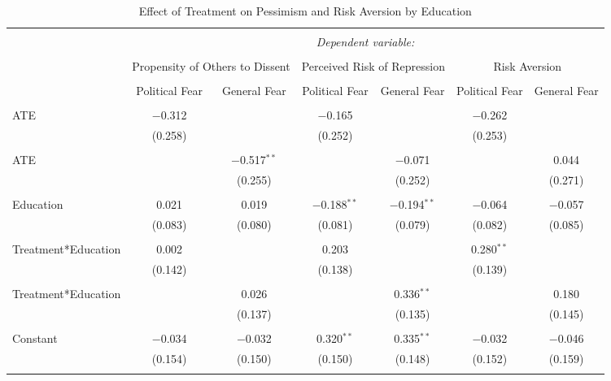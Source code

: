 \documentclass{article}
\begin{document}
\begin{landscape}
\setlength{\tabcolsep}{0.3pt}
\begin{table}[!htbp] \centering 
  \caption{Effect of Treatment on Pessimism and Risk Aversion by Education} 
  \label{} 
\begin{tabular}{@{\extracolsep{5pt}}lcccccc} 
\\[-1.8ex]\hline 
\hline \\[-1.8ex] 
 & \multicolumn{6}{c}{\textit{Dependent variable:}} \\ 
\cline{2-7} 
\\[-1.8ex] & \multicolumn{2}{c}{Propensity of Others to Dissent} & \multicolumn{2}{c}{Perceived Risk of Repression} & \multicolumn{2}{c}{Risk Aversion} \\ 
\\[-1.8ex] & Political Fear & General Fear & Political Fear & General Fear & Political Fear & General Fear\\ 
\hline \\[-1.8ex] 
 ATE & $-$0.312 &  & $-$0.165 &  & $-$0.262 &  \\ 
  & (0.258) &  & (0.252) &  & (0.253) &  \\ 
  & & & & & & \\ 
 ATE &  & $-$0.517$^{**}$ &  & $-$0.071 &  & 0.044 \\ 
  &  & (0.255) &  & (0.252) &  & (0.271) \\ 
  & & & & & & \\ 
 Education & 0.021 & 0.019 & $-$0.188$^{**}$ & $-$0.194$^{**}$ & $-$0.064 & $-$0.057 \\ 
  & (0.083) & (0.080) & (0.081) & (0.079) & (0.082) & (0.085) \\ 
  & & & & & & \\ 
 Treatment*Education & 0.002 &  & 0.203 &  & 0.280$^{**}$ &  \\ 
  & (0.142) &  & (0.138) &  & (0.139) &  \\ 
  & & & & & & \\ 
 Treatment*Education &  & 0.026 &  & 0.336$^{**}$ &  & 0.180 \\ 
  &  & (0.137) &  & (0.135) &  & (0.145) \\ 
  & & & & & & \\ 
 Constant & $-$0.034 & $-$0.032 & 0.320$^{**}$ & 0.335$^{**}$ & $-$0.032 & $-$0.046 \\ 
  & (0.154) & (0.150) & (0.150) & (0.148) & (0.152) & (0.159) \\ 
  & & & & & & \\ 

\end{tabular}
\end{table}
\end{landscape}
\end{document}
